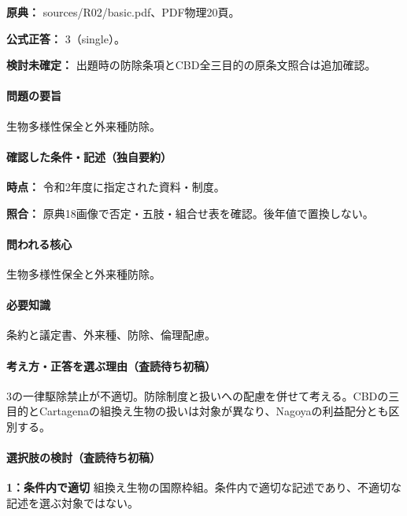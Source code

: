 \noindent\textbf{原典：} sources/R02/basic.pdf、PDF物理20頁。

\textbf{公式正答：} 3（single）。

\par\textbf{検討未確定：} 出題時の防除条項とCBD全三目的の原条文照合は追加確認。

\paragraph{問題の要旨} 生物多様性保全と外来種防除。

\paragraph{確認した条件・記述（独自要約）}\mbox{}\par

\noindent\textbf{時点：} 令和2年度に指定された資料・制度。\par

\noindent\textbf{照合：} 原典18画像で否定・五肢・組合せ表を確認。後年値で置換しない。\par

\paragraph{問われる核心} 生物多様性保全と外来種防除。

\paragraph{必要知識} 条約と議定書、外来種、防除、倫理配慮。

\paragraph{考え方・正答を選ぶ理由（査読待ち初稿）} 3の一律駆除禁止が不適切。防除制度と扱いへの配慮を併せて考える。CBDの三目的とCartagenaの組換え生物の扱いは対象が異なり、Nagoyaの利益配分とも区別する。

\paragraph{選択肢の検討（査読待ち初稿）}\mbox{}\par

\noindent\textbf{1：条件内で適切} 組換え生物の国際枠組。条件内で適切な記述であり、不適切な記述を選ぶ対象ではない。\par

